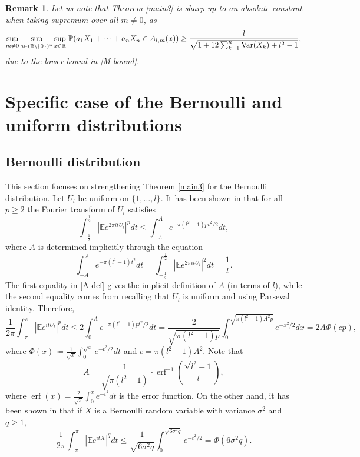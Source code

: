 \documentclass[11pt]{article}
\newtheorem{remark}[thm]{Remark}
\newcommand{\R}{\mathbb{R}}
\DeclareMathOperator{\Var}{Var}
\newcommand{\1}{[1]}
\newcommand{\Prob}{\mathbb{P}}
\def\Var{{\rm Var}}
\begin{document}
\begin{remark}
Let us note that Theorem \ref{main3} is sharp up to an absolute constant when taking supremum over all $m \neq 0$, as
\begin{equation*}
\sup_{m \neq 0} \sup_{a \in (\R \setminus \{0\})^n} \sup_{x \in \R} \, \Prob(a_1 X_1 + \cdots + a_n X_n \in A_{l,m}(x)) \geq \frac{l}{\sqrt{1 + 12 \sum_{k=1}^n \Var(X_k) + l^2-1}},
\end{equation*}
due to the lower bound in \eqref{M-bound}.
\end{remark}


\section{Specific case of the Bernoulli and uniform distributions}

\subsection{Bernoulli distribution}



This section focuses on strengthening Theorem \ref{main3} for the Bernoulli distribution. Let $U_l$ be uniform on $\{1, \dots, l\}$. It has been shown in \cite[Proof of Theorem 1.7]{MR} that for all $p \geq 2$ the Fourier transform of $U_l$ satisfies
\[
    \int_{- \frac 1 2}^{\frac 1 2} \left| \mathbb{E} e^{2 \pi i t U_l} \right|^p dt \leq \int_{- A}^{A} e^{- \pi (l^2 - 1) p t^2 /2} dt,
\]
where $A$ is determined implicitly through the equation
\begin{equation}\label{A-def}
    \int_{-A}^A e^{- \pi (l^2 - 1) t^2} dt = \int_{-\frac 1 2 }^{\frac 12} \left| \mathbb{E}e^{2 \pi i t U_l} \right|^2 dt = \frac 1 l.
\end{equation}
The first equality in \eqref{A-def} gives the implicit definition of $A$ (in terms of $l$), while the second equality comes from recalling that $U_l$ is uniform and using Parseval identity. Therefore,
\begin{equation}\label{A-1} \frac 1 {2\pi} \int_{-\pi}^{\pi} \left| \mathbb{E} e^{itU_l} \right|^p dt \leq 2  \int_{0}^{A} e^{- \pi (l^2 - 1)p t^2 /2} dt = \frac{2}{\sqrt{ \pi  (l^2-1) p}} \int_0^{\sqrt{\pi (l^2-1)A^2 p}} e^{-x^2/2} dx = 2A \Phi (c p),
\end{equation}
where $\Phi(x) \coloneqq \frac 1 {\sqrt{x}} \int_0^{\sqrt{x}} e^{-t^2/2} dt$ and $c = \pi (l^2 -1) A^2$. Note that 
\[
A = \frac{1}{\sqrt{ \pi(l^2 - 1) }} \cdot \operatorname{erf}^{-1}\left( \frac{\sqrt{l^2 - 1}}{l} \right),
\]
where $\operatorname{erf}(x) = \frac{2}{\sqrt{\pi}} \int_0^{x} e^{-t^2} dt$ is the error function. On the other hand, it has been shown in \cite[Theorem 2.8]{MMR} that if $X$ is a Bernoulli random variable with variance $\sigma^2$ and $q \geq 1$,
\begin{equation}\label{A-2}
        \frac 1 {2\pi} \int_{-\pi}^{\pi} \left| \mathbb{E} e^{itX} \right|^q dt \leq \frac 1 {\sqrt{6 \sigma^2 q}} \int_0^{\sqrt{6 \sigma^2 q}} e^{-t^2/2} = \Phi(6 \sigma^2 q).
\end{equation}
    
\end{document}
